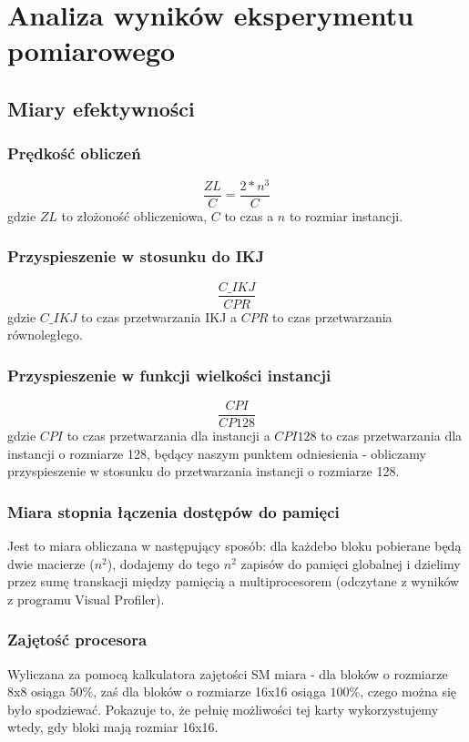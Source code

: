 \documentclass[10pt,a4paper]{article}
\begin{document}
\section{Analiza wyników eksperymentu pomiarowego}
\subsection{Miary efektywności}
\subsubsection*{Prędkość obliczeń}
\begin{equation}
	\frac{ZL}{C} = \frac{2 * n^3}{C}
\end{equation}
gdzie $ZL$ to złożoność obliczeniowa, $C$ to czas a $n$ to rozmiar instancji.

\subsubsection*{Przyspieszenie w stosunku do IKJ}
\begin{equation}
	\frac{C\_IKJ}{CPR}
\end{equation}
gdzie $C\_IKJ$ to czas przetwarzania IKJ a $CPR$ to czas przetwarzania równoległego.

\subsubsection*{Przyspieszenie w funkcji wielkości instancji}
\begin{equation}
	\frac{CPI}{CP 128}
\end{equation}
gdzie $CPI$ to czas przetwarzania dla instancji a $CPI 128$ to czas przetwarzania dla
instancji o rozmiarze 128, będący naszym punktem odniesienia - obliczamy przyspieszenie
w stosunku do przetwarzania instancji o rozmiarze 128.

\subsubsection*{Miara stopnia łączenia dostępów do pamięci}
Jest to miara obliczana w następujący sposób: dla każdebo bloku pobierane
będą dwie macierze ($n^2$), dodajemy do tego $n^2$ zapisów do pamięci globalnej
i dzielimy przez sumę transkacji między pamięcią a multiprocesorem (odczytane
z wyników z programu Visual Profiler).\\

\subsubsection*{Zajętość procesora}
Wyliczana za pomocą kalkulatora zajętości SM miara - dla bloków o rozmiarze
8x8 osiąga $50\%$, zaś dla bloków o rozmiarze 16x16 osiąga $100\%$, czego można
się było spodziewać. Pokazuje to, że pełnię możliwości tej karty wykorzystujemy
wtedy, gdy bloki mają rozmiar 16x16.
\end{document}
